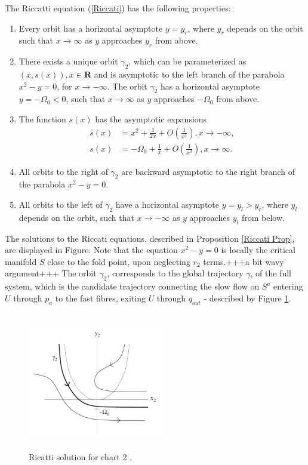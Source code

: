 \begin{prop}\label{Riccati Prop} 
The Riccatti equation (\ref{Riccati}) has the following properties:
\begin{enumerate}
\item Every orbit has a horizontal asymptote $y=y_r$, where $y_r$ depends on the orbit such that $x \to \infty$ as $y$ approaches $y_r$ from above.
\item There exists a unique orbit $\gamma_2$, which can be parameterized as $(x,s(x)), x \in \mathbf{R}$ and is asymptotic to the left branch of the parabola $x^2 - y = 0$, for $x \to - \infty$. The orbit $\gamma_2$ has a horizontal asymptote $y= - \Omega_0 <0$, such that $x \to \infty$ as $y$ approaches $-\Omega_0$ from above.
\item The function $s(x)$ has the asymptotic expansions
\begin{align*}
s(x) &= x^2 + \frac{1}{2x} + O\left( \frac{1}{x^4} \right), x \to -\infty,\\
s(x) &= -\Omega_0 + \frac{1}{x} + O\left( \frac{1}{x^3} \right), x \to \infty.
\end{align*}
\item All orbits to the right of $\gamma_2$  are backward asymptotic to the right branch of the parabola $x^2-y=0$.
\item All orbits to the left of $\gamma_2$ have a horizontal asymptote $y=y_l>y_r$, where $y_l$ depends on the orbit, such that $x \to -\infty$ as $y$ approaches $y_l$ from below.
\end{enumerate}
\end{prop}

The solutions to the Riccati equations, described in Proposition \ref{Riccati Prop}, are displayed in Figure. Note that the equation $x^2 - y=0$ is locally the critical manifold $S$ close to the fold point, upon neglecting $r_2$ terms.+++a bit wavy argument+++
The orbit $\gamma_2$, corresponds to the global trajectory $\gamma$, of the full system, which is the candidate trajectory connecting the slow flow on $S^a$ entering $U$ through $p_a$ to the fast fibres, exiting $U$ through $q_{out}$ - described by Figure \ref{fig: Ricatti Sol}. 
\begin{figure}[h!]\centering
	\includegraphics[height=6cm,width=6cm]{Images/Dynamics_in_K2}
	\caption{Ricatti solution for chart 2 \citep{krupa2001}.}
	\label{fig: Ricatti Sol}
\end{figure}\newpage
 
